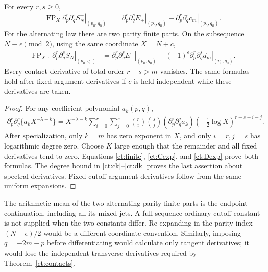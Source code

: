 \begin{theorem}\label{ct:contacts}
For every $r,s\ge0$,
\begin{align}
 \operatorname{FP}_X
 \left.\partial_p^r\partial_q^sS_N^+\right|_{(p_0,q_0)}
 &=\left.\partial_p^r\partial_q^sE_+\right|_{(p_0,q_0)}
    -\left.\partial_p^r\partial_q^sc_m\right|_{(p_0,q_0)}.
                                          \label{ct:pluscontact}
\end{align}
For the alternating law there are two parity finite parts. On the
subsequence $N\equiv\epsilon\pmod2$, using the same coordinate $X=N+c$,
\begin{align}
 \operatorname{FP}_{X,\epsilon}
 \left.\partial_p^r\partial_q^sS_N^-\right|_{(p_0,q_0)}
 &=\left.\partial_p^r\partial_q^sE_-\right|_{(p_0,q_0)}
   +(-1)^\epsilon\left.\partial_p^r\partial_q^sd_m\right|_{(p_0,q_0)}.
                                          \label{ct:minuscontact}
\end{align}
Every contact derivative of total order $r+s>m$ vanishes. The same formulas
hold after fixed argument derivatives if $c$ is held independent while
these derivatives are taken.
\end{theorem}
\begin{proof}
For any coefficient polynomial $a_k(p,q)$,
\begin{align}
 \partial_p^r\partial_q^s\{a_kX^{-\lambda-k}\}
 =X^{-\lambda-k}\sum_{i=0}^r\sum_{j=0}^s
 \binom ri\binom sj(\partial_p^i\partial_q^ja_k)
             \left(-\tfrac12\log X\right)^{r+s-i-j}.
 \label{ct:logjets}
\end{align}
After specialization, only $k=m$ has zero exponent in $X$, and only
$i=r,j=s$ has logarithmic degree zero. Choose $K$ large enough that the
remainder and all fixed derivatives tend to zero. Equations
\eqref{ct:finite}, \eqref{ct:Cexp}, and \eqref{ct:Dexp} prove both formulas.
The degree bound in \eqref{ct:ck}--\eqref{ct:dk} proves the last assertion
about spectral derivatives. Fixed-cutoff argument derivatives follow from
the same uniform expansions.
\end{proof}

The arithmetic mean of the two alternating parity finite parts is the
endpoint continuation, including all its mixed jets. A full-sequence
ordinary cutoff constant is not supplied when the two constants differ.
Re-expanding in the parity index $(N-\epsilon)/2$ would be a different
coordinate convention. Similarly, imposing $q=-2m-p$ before differentiating
would calculate only tangent derivatives; it would lose the independent
transverse derivatives required by Theorem~\ref{ct:contacts}.

